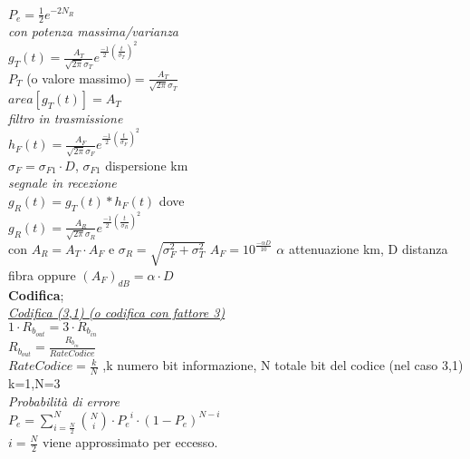 \documentclass[a4paper]{article}
\begin{document}
\begin{multicols*}{2}
$P_e=\frac{1}{2}e^{-2N_R}$ \\
\textit{con potenza massima/varianza }\\
$g_T(t)=\frac{A_T}{\sqrt{2\pi}\sigma_T}e^{\frac{-1}{2}{(\frac{t}{\sigma_T})}^{2}}$
\\ $P_T$ (o valore massimo)$=\frac{A_T}{\sqrt{2\pi}\sigma_T}$ \\
$area[g_T(t)] = A_T$ \\
\textit{filtro in trasmissione }\\
$h_F(t)=\frac{A_F}{\sqrt{2\pi}\sigma_F}e^{\frac{-1}{2}{(\frac{t}{\sigma_F})}^{2}}$ \\
$\sigma_F=\sigma_{F1} \cdot D$, $\sigma_{F1}$ dispersione km\\
\textit{segnale in recezione}\\ 
$g_R(t)=g_T(t)*h_F(t)$ dove \\
$g_R(t)=\frac{A_R}{\sqrt{2\pi}\sigma_R}e^{\frac{-1}{2}{(\frac{t}{\sigma_R})}^{2}}$
\\ con $A_R = A_T \cdot A_F$ e $\sigma_R = \sqrt{\sigma_F^2 + \sigma_T^2}$
$A_F = 10^{\frac{-\alpha D}{10}}$ $\alpha$ attenuazione km, D distanza fibra
oppure ${(A_F)}_{dB}=\alpha\cdot D$ \\
\textbf{Codifica}; \\
\underline{\textit{Codifica (3,1) (o codifica con fattore 3)}} \\
$1\cdot R_{b_{out}}=3\cdot R_{b_{in}}$\\
$R_{b_{out}}=\frac{R_{b_{in}}}{RateCodice}$\\
$RateCodice=\frac{k}{N}$
,k numero bit informazione, N totale bit del codice (nel caso 3,1) k=1,N=3 \\
\textit{Probabilità di errore}\\
$P_e=\sum_{i=\frac{N}{2}}^{N}\binom{N}{i}\cdot {P_e}^{i}\cdot {(1-P_e)}^{N-i}$\\
$i=\frac{N}{2}$ viene approssimato per eccesso.\\
\end{multicols*}
\end{document}
